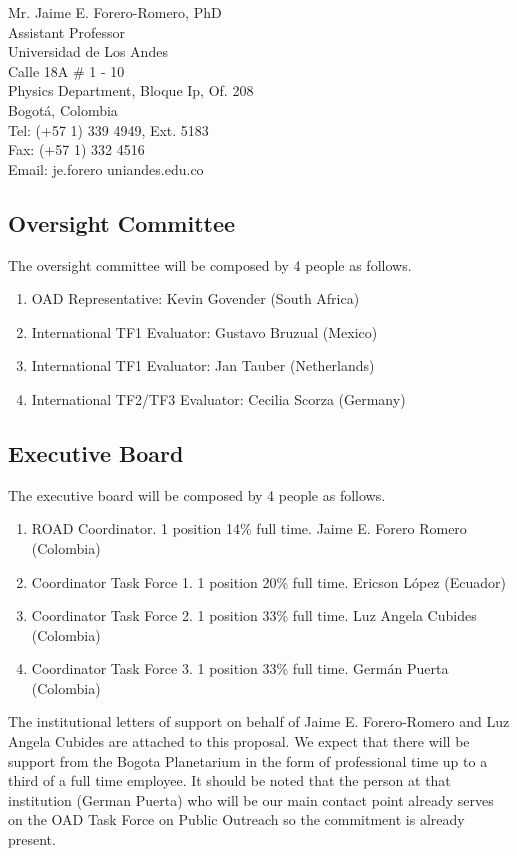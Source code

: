 \documentclass[12pt]{article}
\begin{document}
Mr. Jaime E. Forero-Romero, PhD\\
Assistant Professor\\
Universidad de Los Andes\\
Calle 18A \# 1 - 10\\
Physics Department, Bloque Ip, Of. 208\\
Bogot\'a, Colombia\\
Tel:  (+57 1) 339 4949, Ext. 5183\\
Fax: (+57 1) 332 4516 \\
Email: je.forero uniandes.edu.co\\

\subsection*{Oversight Committee}

The oversight committee will be composed by 4 people as follows.
\begin{enumerate}
\item OAD Representative: Kevin Govender (South Africa)
\item International TF1 Evaluator: Gustavo Bruzual (Mexico)
\item International TF1 Evaluator: Jan Tauber (Netherlands)
\item International TF2/TF3 Evaluator: Cecilia Scorza (Germany)
\end{enumerate}
\subsection*{Executive Board}

The executive board will be composed by 4 people as follows.
\begin{enumerate}
\item ROAD Coordinator. 1 position 14\% full time. Jaime E. Forero
  Romero (Colombia) 
\item Coordinator Task Force 1. 1 position 20\% full time. Ericson
  L\'opez (Ecuador) 
\item Coordinator Task Force 2. 1 position 33\% full time. Luz Angela
  Cubides (Colombia) 
\item Coordinator Task Force 3. 1 position 33\% full time. Germán
  Puerta (Colombia) 
\end{enumerate}
The institutional letters of support on behalf of Jaime
E. Forero-Romero and Luz Angela Cubides are attached to this
proposal. We expect that there will be support from the Bogota
Planetarium in the form of professional time up to a third of a full
time employee. It should be noted that the person at that institution
(German Puerta) who will be our main contact point already serves on
the OAD Task Force on Public Outreach so the commitment is already
present. 
\end{document}
